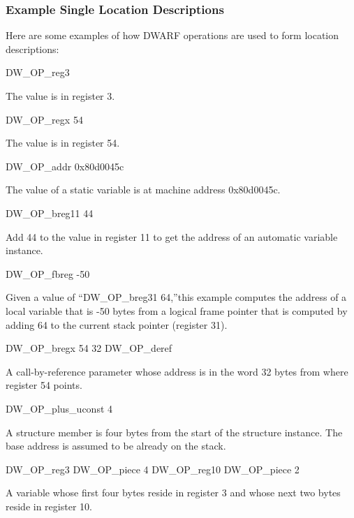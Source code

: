 \subsubsection{Example Single Location Descriptions}

Here are some examples of how DWARF operations are used to form location descriptions:

DW\-\_OP\-\_reg3
\begin{myindentpara}{1cm}
The value is in register 3.
\end{myindentpara}

DW\-\_OP\-\_regx 54
\begin{myindentpara}{1cm}
The value is in register 54.
\end{myindentpara}

DW\-\_OP\-\_addr 0x80d0045c
\begin{myindentpara}{1cm}
The value of a static variable is at machine address 0x80d0045c.
\end{myindentpara}

DW\-\_OP\-\_breg11 44
\begin{myindentpara}{1cm}
Add 44 to the value in register 11 to get the address of an automatic
variable instance.
\end{myindentpara}

DW\-\_OP\-\_fbreg -50
\begin{myindentpara}{1cm}
Given a  value of ``DW\-\_OP\-\_breg31 64,''this example
computes the address of a local variable that is -50 bytes from a
logical frame pointer that is computed by adding 64 to the current
stack pointer (register 31).
\end{myindentpara}

DW\-\_OP\-\_bregx 54 32 DW\-\_OP\-\_deref
\begin{myindentpara}{1cm}
A call-by-reference parameter whose address is in the word 32 bytes
from where register 54 points.
\end{myindentpara}

DW\-\_OP\-\_plus\-\_uconst 4
\begin{myindentpara}{1cm}
A structure member is four bytes from the start of the structure
instance. The base address is assumed to be already on the stack.
\end{myindentpara}

DW\-\_OP\-\_reg3 DW\-\_OP\-\_piece 4 DW\-\_OP\-\_reg10 DW\-\_OP\-\_piece 2
\begin{myindentpara}{1cm}
A variable whose first four bytes reside in register 3 and whose next
two bytes reside in register 10.
\end{myindentpara}

